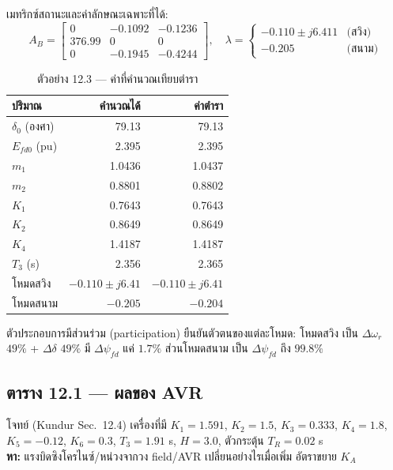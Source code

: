 \documentclass[12pt,a4paper]{article}
\newcommand{\dwr}{\Delta\omega_r}
\newcommand{\ddel}{\Delta\delta}
\newcommand{\dpsifd}{\Delta\psi_{fd}}
\begin{document}
เมทริกซ์สถานะและค่าลักษณะเฉพาะที่ได้:
\begin{equation}
A_B =
\begin{bmatrix}
0 & -0.1092 & -0.1236 \\
376.99 & 0 & 0 \\
0 & -0.1945 & -0.4244
\end{bmatrix},
\quad
\lambda =
\begin{cases}
-0.110 \pm j6.411 & \text{(สวิง)} \\
-0.205 & \text{(สนาม)}
\end{cases}
\end{equation}

\begin{table}[H]
\centering
\caption{ตัวอย่าง 12.3 --- ค่าที่คำนวณเทียบตำรา}
\begin{tabular}{@{}lrr@{}}
\toprule
ปริมาณ & คำนวณได้ & ค่าตำรา \\
\midrule
$\delta_0$ (องศา) & 79.13 & 79.13 \\
$E_{fd0}$ (pu)   & 2.395 & 2.395 \\
$m_1$            & 1.0436 & 1.0437 \\
$m_2$            & 0.8801 & 0.8802 \\
$K_1$            & 0.7643 & 0.7643 \\
$K_2$            & 0.8649 & 0.8649 \\
$K_4$            & 1.4187 & 1.4187 \\
$T_3$ (s)        & 2.356 & 2.365 \\
โหมดสวิง         & $-0.110\pm j6.41$ & $-0.110\pm j6.41$ \\
โหมดสนาม         & $-0.205$ & $-0.204$ \\
\bottomrule
\end{tabular}
\end{table}

ตัวประกอบการมีส่วนร่วม (participation) ยืนยันตัวตนของแต่ละโหมด: โหมดสวิง
เป็น $\dwr$ $49\%$ + $\ddel$ $49\%$ มี $\dpsifd$ แค่ $1.7\%$ ส่วนโหมดสนาม
เป็น $\dpsifd$ ถึง $99.8\%$

\subsection{ตาราง 12.1 --- ผลของ AVR}

\begin{keybox}{โจทย์ (Kundur Sec.\ 12.4)}
เครื่องที่มี $K_1=1.591$, $K_2=1.5$, $K_3=0.333$, $K_4=1.8$, $K_5=-0.12$,
$K_6=0.3$, $T_3=1.91$ s, $H=3.0$, ตัวกระตุ้น $T_R=0.02$ s \\
\textbf{หา:} แรงบิดซิงโครไนซ์/หน่วงจากวง field/AVR เปลี่ยนอย่างไรเมื่อเพิ่ม
อัตราขยาย $K_A$
\end{keybox}
\end{document}
